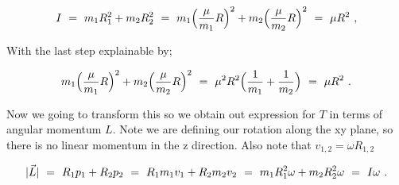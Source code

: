 \documentclass{article}
\begin{document}
\begin{equation} \label{eq:256}
I \hspace{0.125cm} = \hspace{0.125cm} m_1 R^{2}_{1} + m_2 R^{2}_{2} \hspace{0.125cm} = \hspace{0.125cm} m_1 \Big( \frac{\mu}{m_1} R \Big)^2 + m_2 \Big( \frac{\mu}{m_2} R \Big)^2 \hspace{0.125cm} = \hspace{0.125cm} \mu R^2 \hspace{0.125cm} ,
\end{equation}

With the last step explainable by;

\begin{equation} \label{eq:256}
m_1 \Big( \frac{\mu}{m_1} R \Big)^2 + m_2 \Big( \frac{\mu}{m_2} R \Big)^2 \hspace{0.125cm} = \hspace{0.125cm} \mu^2 R^2 \Big( \frac{1}{m_1} + \frac{1}{m_2} \Big) \hspace{0.125cm} = \hspace{0.125cm} \mu R^2 \hspace{0.125cm} .
\end{equation}

Now we going to transform this so we obtain out expression for \begin{math} T \end{math} in terms of angular momentum \begin{math} L \end{math}. Note we are defining our rotation along the xy plane, so there is no linear momentum in the z direction. Also note that \begin{math} v_{1,2} = \omega R_{1,2} \end{math}

\begin{equation} \label{eq:256}
|\vec{L}| \hspace{0.125cm} = \hspace{0.125cm} R_1 p_1 + R_2 p_2 \hspace{0.125cm} = \hspace{0.125cm} R_1 m_1 v_1 + R_2 m_2 v_2 \hspace{0.125cm} = \hspace{0.125cm} m_1 R^{2}_{1} \omega + m_2 R^{2}_{2} \omega \hspace{0.125cm} = \hspace{0.125cm} I \omega \hspace{0.125cm} .
\end{equation}
\end{document}
